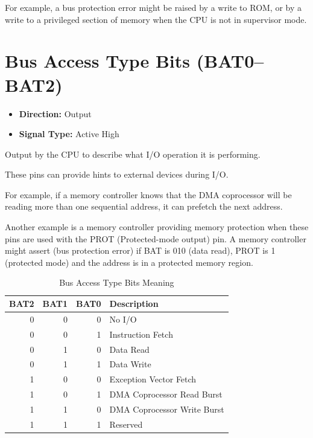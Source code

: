 For example, a bus protection error might be raised by a write to ROM, or by a write to a privileged section of memory
when the CPU is not in supervisor mode.

\section{Bus Access Type Bits (BAT0--BAT2)}

\begin{itemize}
	\item \textbf{Direction:} Output
	\item \textbf{Signal Type:} Active High
\end{itemize}

Output by the CPU to describe what I/O operation it is performing.

These pins can provide hints to external devices during I/O.

For example, if a memory controller knows that the DMA coprocessor will be reading more than one sequential address, it
can prefetch the next address.

Another example is a memory controller providing memory protection when these pins are used with the PROT
(Protected-mode output) pin. A memory controller might assert  (bus protection error) if BAT is 010
(data read), PROT is 1 (protected mode) and the address is in a protected memory region.

\begin{table}[H]
	\centering
	\begin{tabular}{rrrl}
		\toprule
		\textbf{BAT2} & \textbf{BAT1} & \textbf{BAT0} & \textbf{Description}        \\
		\midrule
		0             & 0             & 0             & No I/O                      \\
		0             & 0             & 1             & Instruction Fetch           \\
		0             & 1             & 0             & Data Read                   \\
		0             & 1             & 1             & Data Write                  \\
		1             & 0             & 0             & Exception Vector Fetch      \\
		1             & 0             & 1             & DMA Coprocessor Read Burst  \\
		1             & 1             & 0             & DMA Coprocessor Write Burst \\
		1             & 1             & 1             & Reserved                    \\
		\bottomrule
	\end{tabular}
	\caption{Bus Access Type Bits Meaning}
\end{table}

